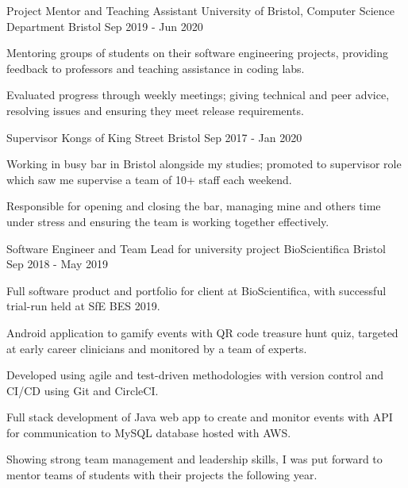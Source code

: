 \vspace{-0.1cm}

\begin{cventries}

  \cventry
    {Project Mentor and Teaching Assistant} %
    {University of Bristol, Computer Science Department} %
    {Bristol} %
    {Sep 2019 - Jun 2020} %
    {
      \begin{cvitems} %
        \item Mentoring groups of students on their software engineering projects, providing feedback to professors and teaching assistance in coding labs.
        \item Evaluated progress through weekly meetings; giving technical and peer advice, resolving issues and ensuring they meet release requirements.
      \end{cvitems}
    }

  \cventry
    {Supervisor} %
    {Kongs of King Street} %
    {Bristol} %
    {Sep 2017 - Jan 2020} %
    {
      \begin{cvitems} %
        \item Working in busy bar in Bristol alongside my studies; promoted to supervisor role which saw me supervise a team of 10+ staff each weekend.
        \item Responsible for opening and closing the bar, managing mine and others time under stress and ensuring the team is working together effectively.
      \end{cvitems}
    }

  \cventry
    {Software Engineer and Team Lead for university project} %
    {BioScientifica} %
    {Bristol} %
    {Sep 2018 - May 2019} %
    {
      \begin{cvitems} %
        \item Full software product and portfolio for client at BioScientifica, with successful trial-run held at SfE BES 2019.
        \item Android application to gamify events with QR code treasure hunt quiz, targeted at early career clinicians and monitored by a team of experts.
        \item Developed using agile and test-driven methodologies with version control and CI/CD using Git and CircleCI.
        \item Full stack development of Java web app to create and monitor events with API for communication to MySQL database hosted with AWS.
        \item Showing strong team management and leadership skills, I was put forward to mentor teams of students with their projects the following year.
      \end{cvitems}
    }


\end{cventries}
